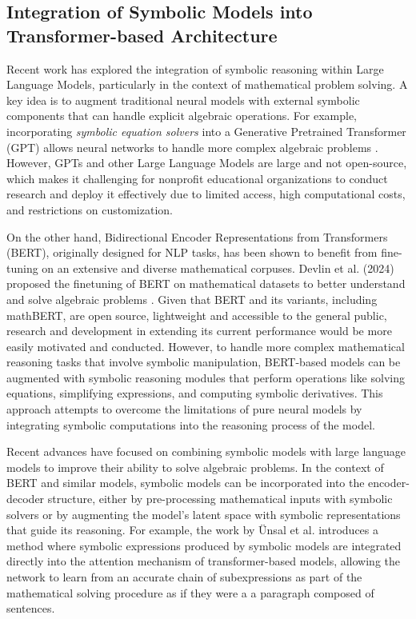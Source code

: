 \documentclass{article}
\begin{document}
\subsection{Integration of Symbolic Models into Transformer-based Architecture}

Recent work has explored the integration of symbolic reasoning within Large Language Models, particularly in the context of mathematical problem solving. A key idea is to augment traditional neural models with external symbolic components that can handle explicit algebraic operations. For example, incorporating \textit{symbolic equation solvers} into a Generative Pretrained Transformer (GPT) allows neural networks to handle more complex algebraic problems \cite{Hu2022Enhancing}. However, GPTs and other Large Language Models are large and not open-source, which makes it challenging for nonprofit educational organizations to conduct research and deploy it effectively due to limited access, high computational costs, and restrictions on customization.

On the other hand, Bidirectional Encoder Representations from Transformers (BERT), originally designed for NLP tasks, has been shown to benefit from fine-tuning on an extensive and diverse mathematical corpuses. Devlin et al. (2024) proposed the finetuning of BERT on mathematical datasets to better understand and solve algebraic problems \cite{DevlinBERT}. Given that BERT and its variants, including mathBERT, are open source, lightweight and accessible to the general public, research and development in extending its current performance would be more easily motivated and conducted. However, to handle more complex mathematical reasoning tasks that involve symbolic manipulation, BERT-based models can be augmented with symbolic reasoning modules that perform operations like solving equations, simplifying expressions, and computing symbolic derivatives. This approach attempts to overcome the limitations of pure neural models by integrating symbolic computations into the reasoning process of the model. 

Recent advances have focused on combining symbolic models with large language models to improve their ability to solve algebraic problems. In the context of BERT and similar models, symbolic models can be incorporated into the encoder-decoder structure, either by pre-processing mathematical inputs with symbolic solvers or by augmenting the model's latent space with symbolic representations that guide its reasoning. For example, the work by Ünsal et al. \cite{Ünsal_Gehr_Vechev_2024} introduces a method where symbolic expressions produced by symbolic models are integrated directly into the attention mechanism of transformer-based models, allowing the network to learn from an accurate chain of subexpressions as part of the mathematical solving procedure as if they were a a paragraph composed of sentences.
\end{document}
